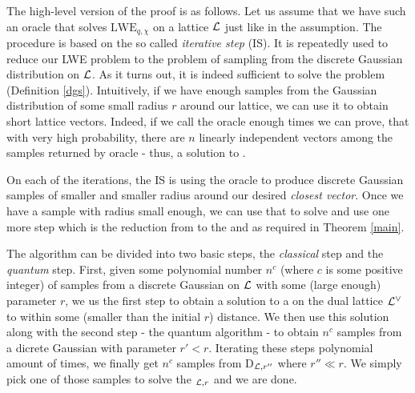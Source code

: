 The high-level version of the proof is as follows. Let us assume that we have such an oracle that solves $\text{LWE}_{q, \chi}$ on a lattice $\mathcal{L}$ just like in the assumption. The procedure is based on the so called \textit{iterative step} (IS). It is repeatedly used to reduce our LWE problem to the problem of sampling from the  discrete Gaussian distribution on $\mathcal{L}$. As it turns out, it is indeed sufficient to solve the  problem (Definition \ref{dgs}). Intuitively, if we have enough samples from the Gaussian distribution of some small radius $r$ around our lattice, we can use it to obtain short lattice vectors. Indeed, if we call the  oracle enough times we can prove, that with very high probability, there are $n$ linearly independent vectors among the samples returned by oracle - thus, a solution to .

On each of the iterations, the IS is using the oracle to produce discrete Gaussian samples of smaller and smaller radius around our desired \textit{closest vector}. Once we have a sample with radius small enough, we can use that to solve  and use one more step which is the reduction from  to the  and  as required in Theorem \ref{main}.

\begin{center}
\end{center}

The algorithm can be divided into two basic steps, the \textit{classical} step and the \textit{quantum} step. First, given some polynomial number $n^c$ (where $c$ is some positive integer) of samples from a discrete Gaussian on $\mathcal{L}$ with some (large enough) parameter $r$, we us the first step to obtain a solution to a  on the dual lattice $\mathcal{L}^{\vee}$ to within some (smaller than the initial $r$) distance. We then use this solution along with the second step - the quantum algorithm - to obtain $n^c$ samples from a dicrete Gaussian with parameter $r' < r$. Iterating these steps polynomial amount of times, we finally get $n^c$ samples from D$_{\mathcal{L}, r''}$ where $r'' \ll r$. We simply pick one of those samples to solve the $_{\mathcal{L}, r}$ and we are done.


